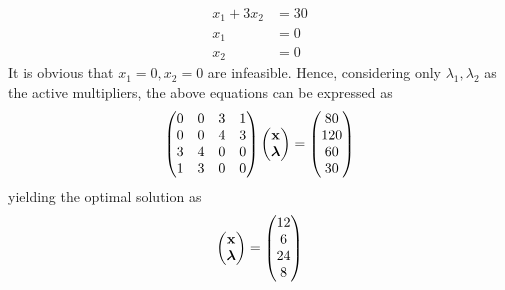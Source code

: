 \documentclass[journal,12pt,twocolumn]{IEEEtran}
\begin{document}
\begin{flushleft}
\begin{enumerate}
\begin{align}
                  x_1 + 3x_2                         & = 30
                  \\
                  x_1                                & = 0
                  \\
                  x_2                                & = 0
              \end{align}
              It is obvious that $x_1=0, x_2=0$ are infeasible.  Hence, considering only $\lambda_1, \lambda_2$ as the active multipliers, the above equations can be expressed as
              \begin{align}
                  \begin{pmatrix}0 & 0 & 3 & 1
                      \\
                  0        & 0 & 4 & 3
                      \\
                  3        & 4 & 0 & 0
                      \\
                  1        & 3 & 0 & 0
                  \end{pmatrix}
                  \begin{pmatrix}\mathbf{x}       \\ \bm{\lambda}\end{pmatrix} = \begin{pmatrix}80\\120\\60\\30\end{pmatrix}
              \end{align}
              yielding the optimal solution as
              \begin{align}
                  \begin{pmatrix}\mathbf{x} \\ \bm{\lambda}\end{pmatrix} = \begin{pmatrix}12\\6\\24\\8\end{pmatrix}
              \end{align}
    \end{enumerate}
\end{flushleft}
\end{document}
